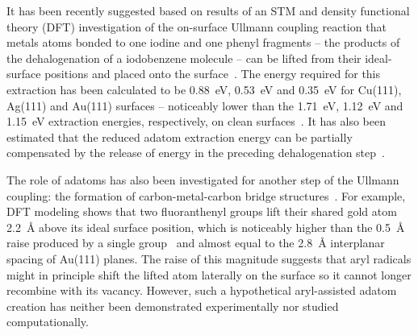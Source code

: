 \documentclass[aps,prb,amsmath,amssymb,11pt]{revtex4-1}
\begin{document}
It has been recently suggested based on results of an STM and density functional theory (DFT) investigation of the on-surface Ullmann coupling reaction that metals atoms bonded to one iodine and one phenyl fragments -- the products of the dehalogenation of a iodobenzene molecule -- can be lifted from their ideal-surface positions and placed onto the surface~\cite{chemeurope2017}. 
The energy required for this extraction has been calculated to be \SI{0.88}{\electronvolt}, \SI{0.53}{\electronvolt} and \SI{0.35}{\electronvolt} for Cu(111), Ag(111) and Au(111) surfaces -- noticeably lower than the \SI{1.71}{\electronvolt}, \SI{1.12}{\electronvolt} and \SI{1.15}{\electronvolt} extraction energies, respectively, on clean surfaces~\cite{chemeurope2017}. %
%
It has also been estimated that the reduced adatom extraction energy can be partially compensated by the release of energy in the preceding dehalogenation step~\cite{chemeurope2017}. %

The role of adatoms has also been investigated for another step of the Ullmann coupling: the formation of carbon-metal-carbon bridge structures~\cite{acsnano2017, jpcc2018, acsnano2019}. 
For example, DFT modeling shows that two fluoranthenyl groups lift their shared gold atom \SI{2.2}{\angstrom} above its ideal surface position, which is noticeably higher than the \SI{0.5}{\angstrom} raise produced by a single group~\cite{jpcc2018} and almost equal to the 
\SI{2.8}{\angstrom} interplanar spacing of Au(111) planes.
The raise of this magnitude suggests that aryl radicals might in principle shift the lifted atom laterally on the surface so it cannot longer recombine with its vacancy. However, such a hypothetical aryl-assisted adatom creation has neither been demonstrated experimentally nor studied computationally.
\end{document}
